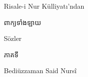 \documentclass{article}
\begin{document}
\begin{center}
\vspace*{18mm}
{\lat\large Risale-i Nur Külliyatı'ndan\par}
\vspace{22mm}
{\kh\fontsize{40}{52}\selectfont ពាក្យទាំងឡាយ\par}
\vspace{6mm}
{\lat\LARGE Sözler\par}
\vspace{10mm}
{\kh\fontsize{20}{28}\selectfont ភាគទី \vol\par}
\vfill
{\lat\Large Bediüzzaman Said Nursî\par}
\vspace{8mm}
\end{center}
\newpage\null
\end{document}
